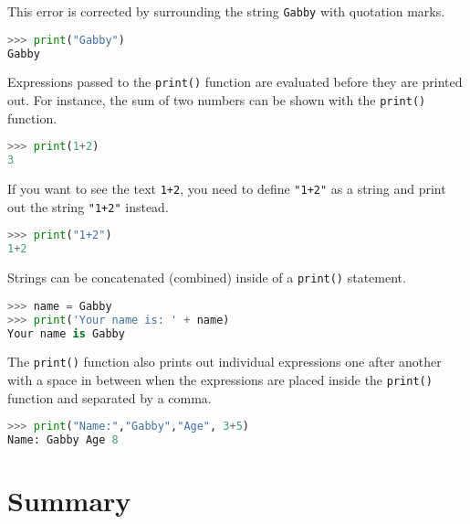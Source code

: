 \documentclass{book}
\newcommand{\passthrough}[1]{#1}
\begin{document}
This error is corrected by surrounding the string
\passthrough{\lstinline!Gabby!} with quotation marks.

\begin{lstlisting}[language=Python]
>>> print("Gabby")
Gabby
\end{lstlisting}
    




    
        Expressions passed to the \passthrough{\lstinline!print()!} function are
evaluated before they are printed out. For instance, the sum of two
numbers can be shown with the \passthrough{\lstinline!print()!}
function.

\begin{lstlisting}[language=Python]
>>> print(1+2)
3
\end{lstlisting}

If you want to see the text \passthrough{\lstinline!1+2!}, you need to
define \passthrough{\lstinline!"1+2"!} as a string and print out the
string \passthrough{\lstinline!"1+2"!} instead.

\begin{lstlisting}[language=Python]
>>> print("1+2")
1+2
\end{lstlisting}
    




    
        Strings can be concatenated (combined) inside of a
\passthrough{\lstinline!print()!} statement.

\begin{lstlisting}[language=Python]
>>> name = Gabby
>>> print('Your name is: ' + name)
Your name is Gabby
\end{lstlisting}
    




    
        The \passthrough{\lstinline!print()!} function also prints out
individual expressions one after another with a space in between when
the expressions are placed inside the \passthrough{\lstinline!print()!}
function and separated by a comma.

\begin{lstlisting}[language=Python]
>>> print("Name:","Gabby","Age", 3+5)
Name: Gabby Age 8
\end{lstlisting}
    




    
        \newpage
        \hypertarget{summary}{%
\section{Summary}\label{summary}}
\end{document}

